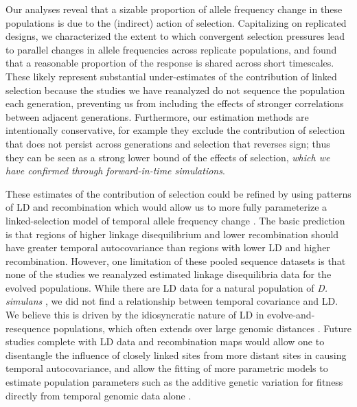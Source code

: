 \documentclass[11pt]{article}
\newcommand{\vb}[1]{{\it \color{blue} #1}}
\begin{document}
Our analyses reveal that a sizable proportion of allele frequency change in
these populations is due to the (indirect) action of selection. Capitalizing on
replicated designs, we characterized the extent to which convergent selection
pressures lead to parallel changes in allele frequencies across replicate
populations, and found that a reasonable proportion of the response is shared
across short timescales. These likely represent substantial under-estimates of
the contribution of linked selection because the studies we have reanalyzed do
not sequence the population each generation, preventing us from including the
effects of stronger correlations between adjacent generations.  Furthermore,
our estimation methods are intentionally conservative, for example they exclude
the contribution of selection that does not persist across generations and
selection that reverses sign; thus they can be seen as a strong lower bound of
the effects of selection, \vb{which we have confirmed through forward-in-time
simulations}.

These estimates of the contribution of selection could be refined by using
patterns of LD and recombination which would allow us to more fully
parameterize a linked-selection model of temporal allele frequency change
\parencite{Buffalo2019-io}. The basic prediction is that regions of higher
linkage disequilibrium and lower recombination should have greater temporal
autocovariance than regions with lower LD and higher recombination. However,
one limitation of these pooled sequence datasets is that none of the studies we
reanalyzed estimated linkage disequilibria data for the evolved populations.
While there are LD data for a natural population of \emph{D. simulans}
\parencite{Signor2018-wg,Howie2018-ay},  we did not find a relationship between
temporal covariance and LD.  We believe this is driven by the idiosyncratic
nature of LD in evolve-and-resequence populations, which often extends over
large genomic distances \parencite{Nuzhdin2013-gf,Kelly2019-dc}. Future studies
complete with LD data and recombination maps would allow one to disentangle the
influence of closely linked sites from more distant sites in causing temporal
autocovariance, and allow the fitting of more parametric models to estimate
population parameters such as the additive genetic variation for fitness
directly from temporal genomic data alone \parencite{Buffalo2019-io}.
\end{document}
